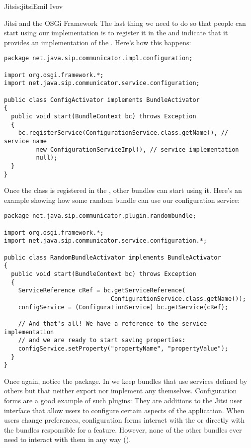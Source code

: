 \begin{aosachapter}{Jitsi}{s:jitsi}{Emil Ivov}
\begin{aosasect1}{Jitsi and the OSGi Framework}
The last thing we need to do so that people can start using our
implementation is to register it in the  and
indicate that it provides an implementation of the
. Here's how this happens:

\begin{verbatim}
package net.java.sip.communicator.impl.configuration;

import org.osgi.framework.*;
import net.java.sip.communicator.service.configuration;

public class ConfigActivator implements BundleActivator
{
  public void start(BundleContext bc) throws Exception
  {
    bc.registerService(ConfigurationService.class.getName(), // service name
         new ConfigurationServiceImpl(), // service implementation
         null);
  }
}
\end{verbatim}

\noindent Once the  class is registered in the
, other bundles can start using it. Here's an
example showing how some random bundle can use our configuration
service:

\begin{verbatim}
package net.java.sip.communicator.plugin.randombundle;

import org.osgi.framework.*;
import net.java.sip.communicator.service.configuration.*;

public class RandomBundleActivator implements BundleActivator
{
  public void start(BundleContext bc) throws Exception
  {
    ServiceReference cRef = bc.getServiceReference(
                              ConfigurationService.class.getName());
    configService = (ConfigurationService) bc.getService(cRef);

    // And that's all! We have a reference to the service implementation
    // and we are ready to start saving properties:
    configService.setProperty("propertyName", "propertyValue");
  }
}
\end{verbatim}

\noindent Once again, notice the package. In
 we keep bundles that use
services defined by others but that neither export nor implement any
themselves. Configuration forms are a good example of such plugins:
They are additions to the Jitsi user interface that allow users to
configure certain aspects of the application. When users change
preferences, configuration forms interact with the
 or directly with the bundles responsible
for a feature. However, none of the other bundles ever need to
interact with them in any way ().


\end{aosasect1}
\end{aosachapter}

